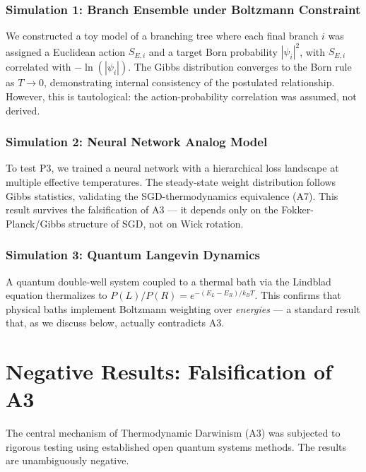 \documentclass[aps,prl,twocolumn,superscriptaddress,longbibliography]{revtex4-2}
\begin{document}
\subsubsection{Simulation 1: Branch Ensemble under Boltzmann Constraint}

We constructed a toy model of a branching tree where each final branch $i$ was assigned a Euclidean action $S_{E,i}$ and a target Born probability $|\psi_i|^2$, with $S_{E,i}$ correlated with $- \ln(|\psi_i|)$. The Gibbs distribution converges to the Born rule as $T \to 0$, demonstrating internal consistency of the postulated relationship. However, this is tautological: the action-probability correlation was assumed, not derived.

\subsubsection{Simulation 2: Neural Network Analog Model}

To test P3, we trained a neural network with a hierarchical loss landscape at multiple effective temperatures. The steady-state weight distribution follows Gibbs statistics, validating the SGD-thermodynamics equivalence (A7). This result survives the falsification of A3 --- it depends only on the Fokker-Planck/Gibbs structure of SGD, not on Wick rotation.

\subsubsection{Simulation 3: Quantum Langevin Dynamics}

A quantum double-well system coupled to a thermal bath via the Lindblad equation thermalizes to $P(L)/P(R) = e^{-(E_L-E_R)/k_B T}$. This confirms that physical baths implement Boltzmann weighting over \emph{energies} --- a standard result that, as we discuss below, actually contradicts A3.

\section{Negative Results: Falsification of A3}

The central mechanism of Thermodynamic Darwinism (A3) was subjected to rigorous testing using established open quantum systems methods. The results are unambiguously negative.
\end{document}
